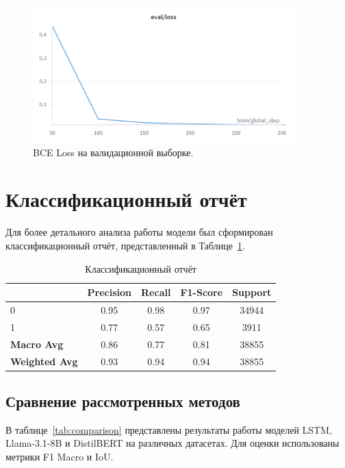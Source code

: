 \documentclass[12pt]{article}
\begin{document}
\begin{figure}[h]
\centering
\includegraphics[width=0.9\textwidth]{W&B Chart 22.11.2024, 17_48_48.png}
\caption{BCE Loss на валидационной выборке.}
\label{fig:val_loss}
\end{figure}

\section*{Классификационный отчёт}
Для более детального анализа работы модели был сформирован классификационный отчёт, представленный в Таблице~\ref{tab:classification_report}.
\begin{table}[ht]
\centering
\begin{tabular}{lcccc}
\toprule
 & \textbf{Precision} & \textbf{Recall} & \textbf{F1-Score} & \textbf{Support} \\
\midrule
0 & 0.95 & 0.98 & 0.97 & 34944 \\
1 & 0.77 & 0.57 & 0.65 & 3911 \\
\midrule
\textbf{Macro Avg} & 0.86 & 0.77 & 0.81 & 38855 \\
\textbf{Weighted Avg} & 0.93 & 0.94 & 0.94 & 38855 \\
\bottomrule
\end{tabular}
\caption{Классификационный отчёт}
\label{tab:classification_report}
\end{table}

\subsection{Сравнение рассмотренных методов}

В таблице~\ref{tab:comparison} представлены результаты работы моделей LSTM, Llama-3.1-8B и DistilBERT на различных датасетах. Для оценки использованы метрики F1 Macro и IoU.
\end{document}
